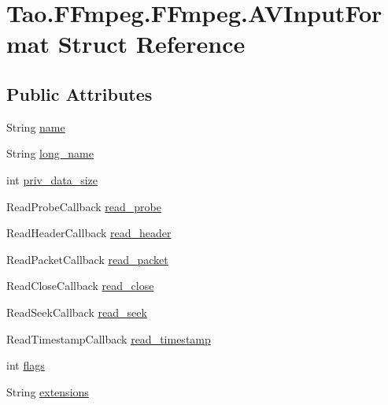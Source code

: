 \hypertarget{struct_tao_1_1_f_fmpeg_1_1_f_fmpeg_1_1_a_v_input_format}{
\section{Tao.FFmpeg.FFmpeg.AVInputFormat Struct Reference}
\label{struct_tao_1_1_f_fmpeg_1_1_f_fmpeg_1_1_a_v_input_format}
}
\subsection*{Public Attributes}
\begin{DoxyCompactItemize}
\item 
String \hyperlink{struct_tao_1_1_f_fmpeg_1_1_f_fmpeg_1_1_a_v_input_format_ae7ea1d279372bdeb9a4f096cd453da51}{name}
\item 
String \hyperlink{struct_tao_1_1_f_fmpeg_1_1_f_fmpeg_1_1_a_v_input_format_a78c344da058cb4a20652dee3c58a19c9}{long\_\-name}
\item 
int \hyperlink{struct_tao_1_1_f_fmpeg_1_1_f_fmpeg_1_1_a_v_input_format_aa2f69606a86705b5d0005dc326e6b956}{priv\_\-data\_\-size}
\item 
ReadProbeCallback \hyperlink{struct_tao_1_1_f_fmpeg_1_1_f_fmpeg_1_1_a_v_input_format_a99514f9c69037d03722066532b4357bd}{read\_\-probe}
\item 
ReadHeaderCallback \hyperlink{struct_tao_1_1_f_fmpeg_1_1_f_fmpeg_1_1_a_v_input_format_a3bf9a1ce55e8c541c9a3ff9c1cb1609a}{read\_\-header}
\item 
ReadPacketCallback \hyperlink{struct_tao_1_1_f_fmpeg_1_1_f_fmpeg_1_1_a_v_input_format_a1aa1a27cde1666064d8fbbb404814d8b}{read\_\-packet}
\item 
ReadCloseCallback \hyperlink{struct_tao_1_1_f_fmpeg_1_1_f_fmpeg_1_1_a_v_input_format_a81978a3922e515d3a274af9c1062a433}{read\_\-close}
\item 
ReadSeekCallback \hyperlink{struct_tao_1_1_f_fmpeg_1_1_f_fmpeg_1_1_a_v_input_format_a32acdddea242216b60d3887ad2755436}{read\_\-seek}
\item 
ReadTimestampCallback \hyperlink{struct_tao_1_1_f_fmpeg_1_1_f_fmpeg_1_1_a_v_input_format_a145fa32658fb7753384e7e4004ded490}{read\_\-timestamp}
\item 
int \hyperlink{struct_tao_1_1_f_fmpeg_1_1_f_fmpeg_1_1_a_v_input_format_ac393d3834db1e4ff22807535818b1028}{flags}
\item 
String \hyperlink{struct_tao_1_1_f_fmpeg_1_1_f_fmpeg_1_1_a_v_input_format_a22e4f2f98f293d3f42824e3451ec942f}{extensions}

\end{DoxyCompactItemize}
